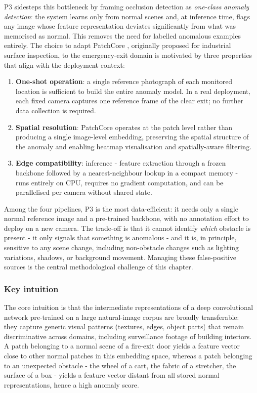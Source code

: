 P3 sidesteps this bottleneck by framing occlusion detection as
\emph{one-class anomaly detection}: the system learns only from normal scenes
and, at inference time, flags any image whose feature representation deviates
significantly from what was memorised as normal. This removes the need for
labelled anomalous examples entirely. The choice to adapt PatchCore
\cite{Roth2022}, originally proposed for industrial surface inspection, to the
emergency-exit domain is motivated by three properties that align with the
deployment context:

\begin{enumerate}
  \item \textbf{One-shot operation}: a single reference photograph of each
  monitored location is sufficient to build the entire anomaly model. In a real
  deployment, each fixed camera captures one reference frame of the clear exit;
  no further data collection is required.
  \item \textbf{Spatial resolution}: PatchCore operates at the patch level rather
  than producing a single image-level embedding, preserving the spatial
  structure of the anomaly and enabling heatmap visualisation and
  spatially-aware filtering.
  \item \textbf{Edge compatibility}: inference - feature extraction through a
  frozen backbone followed by a nearest-neighbour lookup in a compact memory -
  runs entirely on CPU, requires no gradient computation, and can be
  parallelised per camera without shared state.
\end{enumerate}

Among the four pipelines, P3 is the most data-efficient: it needs only a single
normal reference image and a pre-trained backbone, with no annotation effort to
deploy on a new camera. The trade-off is that it cannot identify \emph{which}
obstacle is present - it only signals that something is anomalous - and it is, in
principle, sensitive to any scene change, including non-obstacle changes such as
lighting variations, shadows, or background movement. Managing these
false-positive sources is the central methodological challenge of this chapter.

\subsubsection{Key intuition}

The core intuition is that the intermediate representations of a deep
convolutional network pre-trained on a large natural-image corpus are broadly
transferable: they capture generic visual patterns (textures, edges, object
parts) that remain discriminative across domains, including surveillance footage
of building interiors. A patch belonging to a normal scene of a fire-exit door
yields a feature vector close to other normal patches in this embedding space,
whereas a patch belonging to an unexpected obstacle - the wheel of a cart, the
fabric of a stretcher, the surface of a box - yields a feature vector distant
from all stored normal representations, hence a high anomaly score.

